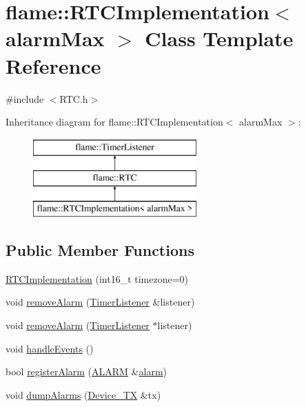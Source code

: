 \hypertarget{classflame_1_1_r_t_c_implementation}{\section{flame\-:\-:R\-T\-C\-Implementation$<$ alarm\-Max $>$ Class Template Reference}
\label{classflame_1_1_r_t_c_implementation}
}


{\ttfamily \#include $<$R\-T\-C.\-h$>$}

Inheritance diagram for flame\-:\-:R\-T\-C\-Implementation$<$ alarm\-Max $>$\-:\begin{figure}[H]
\begin{center}
\leavevmode
\includegraphics[height=3.000000cm]{classflame_1_1_r_t_c_implementation}
\end{center}
\end{figure}
\subsection*{Public Member Functions}
\begin{DoxyCompactItemize}
\item 
\hyperlink{classflame_1_1_r_t_c_implementation_a492782c8afb5c98850df157c2212fa7b}{R\-T\-C\-Implementation} (int16\-\_\-t timezone=0)
\item 
void \hyperlink{classflame_1_1_r_t_c_implementation_a30401cf4b8502e2fe0d84de3e8782247}{remove\-Alarm} (\hyperlink{classflame_1_1_timer_listener}{Timer\-Listener} \&listener)
\item 
void \hyperlink{classflame_1_1_r_t_c_implementation_a8cc6e18423b995561d15b8895dff63be}{remove\-Alarm} (\hyperlink{classflame_1_1_timer_listener}{Timer\-Listener} $\ast$listener)
\item 
void \hyperlink{classflame_1_1_r_t_c_implementation_a36c258ed2b279ec84172186e988310ab}{handle\-Events} ()
\item 
bool \hyperlink{classflame_1_1_r_t_c_implementation_aa89b6bdab92700b2c51bcb9c421bbfdb}{register\-Alarm} (\hyperlink{namespaceflame_a7a5a7b0bdd1b44d7d0b0a600552b5ab5}{A\-L\-A\-R\-M} \&\hyperlink{structflame_1_1alarm}{alarm})
\item 
void \hyperlink{classflame_1_1_r_t_c_implementation_ab93e0c3fcf47d3b12c4b904103bb7b64}{dump\-Alarms} (\hyperlink{classflame_1_1_device___t_x}{Device\-\_\-\-T\-X} \&tx)
\end{DoxyCompactItemize}
